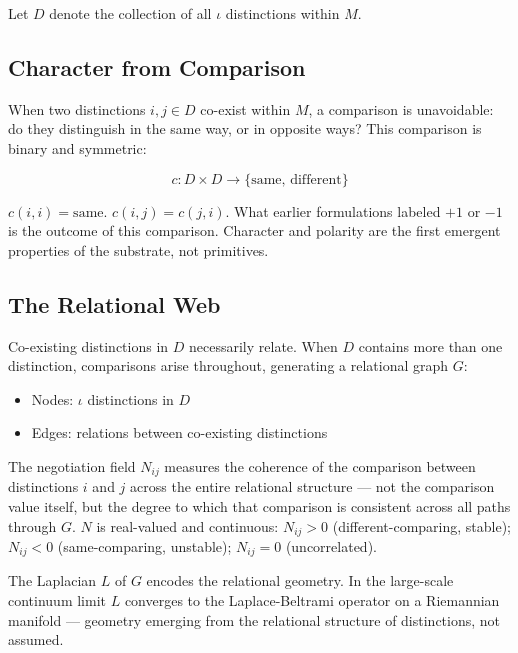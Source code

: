 \documentclass[11pt,letterpaper]{article}
\begin{document}
Let \(D\) denote the collection of all \(\iota\) distinctions within \(M\).

\subsection{Character from Comparison}
\label{sec:org2750fca}

When two distinctions \(i, j \in D\) co-exist within \(M\), a comparison is unavoidable: do they distinguish in the same way, or in opposite ways? This comparison is binary and symmetric:

\begin{equation}
c : D \times D \to \{\mathrm{same},\, \mathrm{different}\}
\end{equation}

\(c(i,i) = \mathrm{same}\). \(c(i,j) = c(j,i)\). What earlier formulations labeled \(+1\) or \(-1\) is the outcome of this comparison. Character and polarity are the first emergent properties of the substrate, not primitives.

\subsection{The Relational Web}
\label{sec:org578bd22}

Co-existing distinctions in \(D\) necessarily relate. When \(D\) contains more than one distinction, comparisons arise throughout, generating a relational graph \(G\):

\begin{itemize}
\item Nodes: \(\iota\) distinctions in \(D\)
\item Edges: relations between co-existing distinctions
\end{itemize}

The negotiation field \(N_{ij}\) measures the coherence of the comparison between distinctions \(i\) and \(j\) across the entire relational structure --- not the comparison value itself, but the degree to which that comparison is consistent across all paths through \(G\). \(N\) is real-valued and continuous: \(N_{ij} > 0\) (different-comparing, stable); \(N_{ij} < 0\) (same-comparing, unstable); \(N_{ij} = 0\) (uncorrelated).

The Laplacian \(L\) of \(G\) encodes the relational geometry. In the large-scale continuum limit \(L\) converges to the Laplace-Beltrami operator on a Riemannian manifold --- geometry emerging from the relational structure of distinctions, not assumed.
\end{document}
